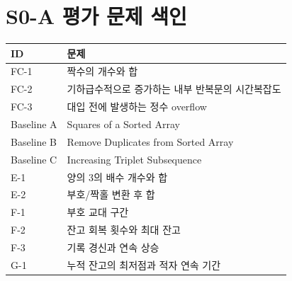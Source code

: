 
\chapter{S0-A 평가 문제 색인}
\begin{longtable}{p{2.4cm}p{9.5cm}}
\toprule
\textbf{ID} & \textbf{문제} \\
\midrule
FC-1 & 짝수의 개수와 합 \\
FC-2 & 기하급수적으로 증가하는 내부 반복문의 시간복잡도 \\
FC-3 & 대입 전에 발생하는 정수 overflow \\
Baseline A & Squares of a Sorted Array \\
Baseline B & Remove Duplicates from Sorted Array \\
Baseline C & Increasing Triplet Subsequence \\
E-1 & 양의 3의 배수 개수와 합 \\
E-2 & 부호/짝홀 변환 후 합 \\
F-1 & 부호 교대 구간 \\
F-2 & 잔고 회복 횟수와 최대 잔고 \\
F-3 & 기록 경신과 연속 상승 \\
G-1 & 누적 잔고의 최저점과 적자 연속 기간 \\
\bottomrule
\end{longtable}